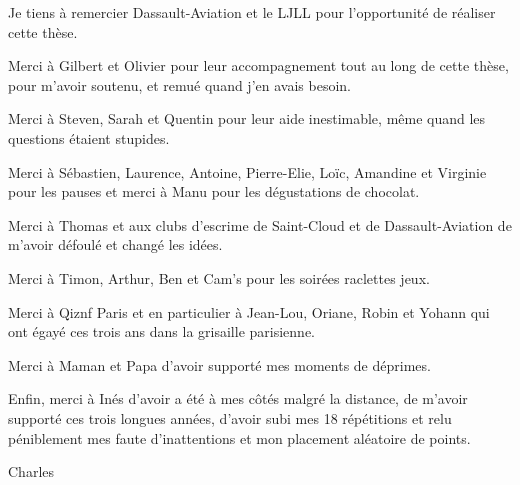 Je tiens à remercier Dassault-Aviation et le LJLL pour l'opportunité de réaliser cette thèse.

Merci à Gilbert et Olivier pour leur accompagnement tout au long de cette thèse, pour m'avoir soutenu, et remué quand j'en avais besoin.

Merci à Steven, Sarah et Quentin pour leur aide inestimable, même quand les questions étaient stupides.

Merci à Sébastien, Laurence, Antoine, Pierre-Elie, Loïc, Amandine et Virginie pour les pauses et merci à Manu pour les dégustations de chocolat.

Merci à Thomas et aux clubs d'escrime de Saint-Cloud et de Dassault-Aviation de m'avoir défoulé et changé les idées.

Merci à Timon, Arthur, Ben et Cam's pour les soirées raclettes jeux.

Merci à Qiznf Paris et en particulier à Jean-Lou, Oriane, Robin et Yohann qui ont égayé ces trois ans dans la grisaille parisienne.

Merci à Maman et Papa d'avoir supporté mes moments de déprimes.

Enfin, merci à Inés d'avoir a été à mes côtés malgré la distance, de m'avoir supporté ces trois longues années, d'avoir subi mes 18 répétitions et relu péniblement mes faute d'inattentions et mon placement aléatoire de points.

\begin{flushright}
    Charles
\end{flushright}